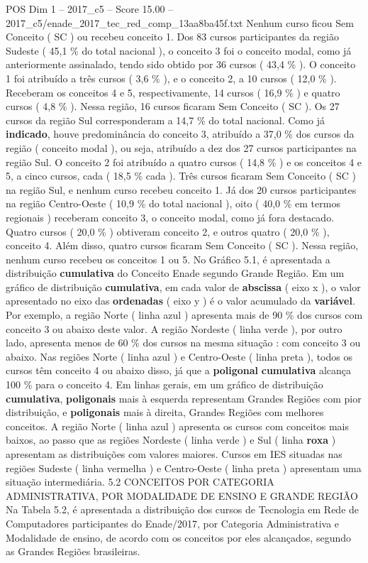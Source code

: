 \begin{textsample}{POS Dim 1 – 2017\_c5 – Score 15.00 – 2017\_c5/enade\_2017\_tec\_red\_comp\_13aa8ba45f.txt}
Nenhum curso ficou Sem Conceito ( SC ) ou recebeu conceito 1.
Dos 83 cursos participantes da região Sudeste ( 45,1 \% do total nacional ), o conceito 3 foi o conceito modal, como já anteriormente assinalado, tendo sido obtido por 36 cursos ( 43,4 \% ).
O conceito 1 foi atribuído a três cursos ( 3,6 \% ), e o conceito 2, a 10 cursos ( 12,0 \% ).
Receberam os conceitos 4 e 5, respectivamente, 14 cursos ( 16,9 \% ) e quatro cursos ( 4,8 \% ).
Nessa região, 16 cursos ficaram Sem Conceito ( SC ).
Os 27 cursos da região Sul corresponderam a 14,7 \% do total nacional.
Como já \textbf{indicado}, houve predominância do conceito 3, atribuído a 37,0 \% dos cursos da região ( conceito modal ), ou seja, atribuído a dez dos 27 cursos participantes na região Sul.
O conceito 2 foi atribuído a quatro cursos ( 14,8 \% ) e os conceitos 4 e 5, a cinco cursos, cada ( 18,5 \% cada ).
Três cursos ficaram Sem Conceito ( SC ) na região Sul, e nenhum curso recebeu conceito 1.
Já dos 20 cursos participantes na região Centro-Oeste ( 10,9 \% do total nacional ), oito ( 40,0 \% em termos regionais ) receberam conceito 3, o conceito modal, como já fora destacado.
Quatro cursos ( 20,0 \% ) obtiveram conceito 2, e outros quatro ( 20,0 \% ), conceito 4.
Além disso, quatro cursos ficaram Sem Conceito ( SC ).
Nessa região, nenhum curso recebeu os conceitos 1 ou 5.
No Gráfico 5.1, é apresentada a distribuição \textbf{cumulativa} do Conceito Enade segundo Grande Região.
Em um gráfico de distribuição \textbf{cumulativa}, em cada valor de \textbf{abscissa} ( eixo x ), o valor apresentado no eixo das \textbf{ordenadas} ( eixo y ) é o valor acumulado da \textbf{variável}.
Por exemplo, a região Norte ( linha azul ) apresenta mais de 90 \% dos cursos com conceito 3 ou abaixo deste valor.
A região Nordeste ( linha verde ), por outro lado, apresenta menos de 60 \% dos cursos na mesma situação : com conceito 3 ou abaixo.
Nas regiões Norte ( linha azul ) e Centro-Oeste ( linha preta ), todos os cursos têm conceito 4 ou abaixo disso, já que a \textbf{poligonal} \textbf{cumulativa} alcança 100 \% para o conceito 4.
Em linhas gerais, em um gráfico de distribuição \textbf{cumulativa}, \textbf{poligonais} mais à esquerda representam Grandes Regiões com pior distribuição, e \textbf{poligonais} mais à direita, Grandes Regiões com melhores conceitos.
A região Norte ( linha azul ) apresenta os cursos com conceitos mais baixos, ao passo que as regiões Nordeste ( linha verde ) e Sul ( linha \textbf{roxa} ) apresentam as distribuições com valores maiores.
Cursos em IES situadas nas regiões Sudeste ( linha vermelha ) e Centro-Oeste ( linha preta ) apresentam uma situação intermediária. 5.2 CONCEITOS POR CATEGORIA ADMINISTRATIVA, POR MODALIDADE DE ENSINO E GRANDE REGIÃO Na Tabela 5.2, é apresentada a distribuição dos cursos de Tecnologia em Rede de Computadores participantes do Enade/2017, por Categoria Administrativa e Modalidade de ensino, de acordo com os conceitos por eles alcançados, segundo as Grandes Regiões brasileiras.

\end{textsample}
